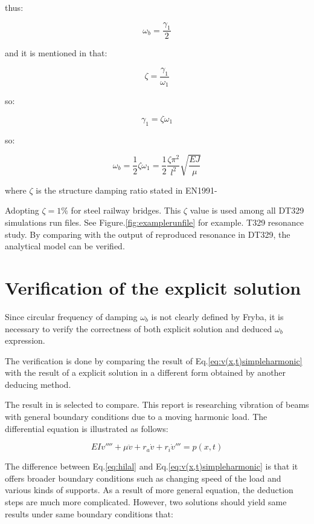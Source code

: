 thus:


\begin{equation}
    \omega_b = \frac{\gamma_1}{2}
\end{equation}

and it is mentioned in \citet[Eq.8]{abu2000vibration} that:

$$\zeta = \frac{\gamma_1}{\omega_1}$$

so:

$$\gamma_1 = \zeta\omega_1$$

so:

$$\omega_b = \frac{1}{2}\zeta\omega_1 = \frac{1}{2}\frac{\zeta\pi^2}{l^2}\sqrt{\frac{EJ}{\mu}}$$

where $\zeta$ is the structure damping ratio stated in EN1991-

Adopting $\zeta = 1\%$ for steel railway bridges. This $\zeta$ value is used among all DT329 simulations run files. See Figure.\ref{fig:examplerunfile} for example.
T329 resonance study. By comparing with the output of reproduced resonance in DT329, the analytical model can be verified.

\section{Verification of the explicit solution}
Since circular frequency of damping $\omega_b$ is not clearly defined by Fryba, it is necessary to verify the correctness of both explicit solution and deduced $\omega_b$ expression.

The verification is done by comparing the result of Eq.\ref{eq:v(x,t)simpleharmonic} with the result of a explicit solution in a different form obtained by another deducing method.  

The result in \citet{abu2000vibration} is selected to compare. This report is researching vibration of beams with general boundary conditions due to a moving harmonic load. The differential equation is illustrated as follows:

\begin{equation}\label{eq:hilal}
    EIv''''+\mu \ddot{v} + r_a \dot{v}+r_i \dot{v}''' = p(x,t)
\end{equation}

The difference between Eq.\ref{eq:hilal} and Eq.\ref{eq:v(x,t)simpleharmonic} is that it offers broader boundary conditions such as changing speed of the load and various kinds of supports. As a result of more general equation, the deduction steps are much more complicated. However, two solutions should yield same results under same boundary conditions that:


